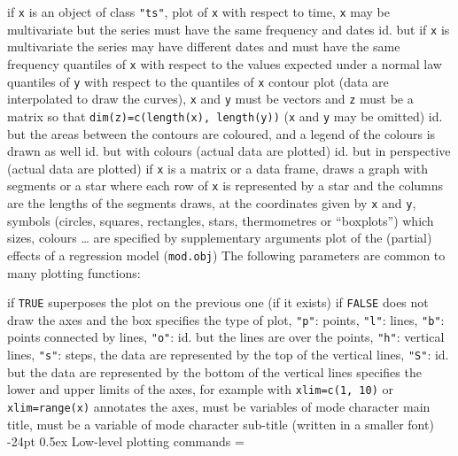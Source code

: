 \documentclass[10pt,landscape]{article}
\makeatletter
\renewcommand\section{\@startsection{section}{1}{0mm}%
                                     {-24pt}%
                                     {0.5ex}%
                                {\color{blue}\normalfont\large\bfseries}}
\newcommand{\code}{\texttt}
\newcommand\F{\code{FALSE}}
\newcommand\T{\code{TRUE}}
\makeatother
\begin{document}
\begin{multicols*}{3}
  if \code{x} is an object of class \code{"ts"}, plot of \code{x} with respect to time, \code{x}	{ may be multivariate but the series must have the same frequency and dates}
  id. but if \code{x}	{is multivariate the series may have different dates and must have the same frequency}
  quantiles of \code{x}	{with respect to the values expected under a normal law}
  quantiles of \code{y}	{with respect to the quantiles of \code{x}}
  contour plot (data are interpolated to draw the curves), \code{x} and \code{y} must be vectors and \code{z} must be a matrix so that \code{dim(z)=c(length(x), length(y))} (\code{x} and \code{y}	{may be omitted)}
	{ id. but the areas between the contours are coloured, and a legend of the colours is drawn as well}
	{ id. but with colours (actual data are plotted)}
	{ id. but in perspective (actual data are plotted)}
  if \code{x} is a matrix or a data frame, draws a graph with segments or a star where each row of \code{x}	{is represented by a star and the columns are the lengths of the segments}
  draws, at the coordinates given by \code{x} and \code{y}, symbols (circles, squares, rectangles, stars, thermometres or ``boxplots'') which sizes, colours \ldots{}	{are specified by supplementary arguments}
	{ plot of the (partial) effects of a regression model (\code{mod.obj})}
The following parameters are common to many plotting functions:

  if \T{}	{superposes the plot on the previous one (if it exists)}
  if \F{}	{does not draw the axes and the box}
	{ specifies the type of plot, \code{"p"}: points, \code{"l"}: lines, \code{"b"}: points connected by lines, \code{"o"}: id. but the lines are over the points, \code{"h"}: vertical lines, \code{"s"}: steps, the data are represented by the top of the vertical lines, \code{"S"}: id. but the data are represented by the bottom of the vertical lines}
  specifies the lower and upper limits of the axes, for example with \code{xlim=c(1, 10)}	{or \code{xlim=range(x)}}
	{ annotates the axes, must be variables of mode character}
	{ main title, must be a variable of mode character}
	{ sub-title (written in a smaller font)}
\section{Low-level plotting commands}
\everypar={\hangindent=9mm}


\end{multicols*}
\end{document}
